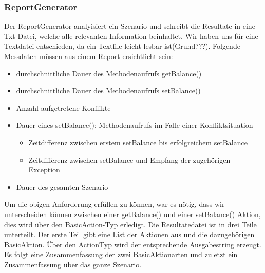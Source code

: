 \subsubsection{ReportGenerator}
\label{sec:reportGenerator}
Der ReportGenerator analyisiert ein Szenario und schreibt die Resultate in eine Txt-Datei, welche alle relevanten Information beinhaltet. Wir haben uns für eine Textdatei entschieden, da ein Textfile leicht lesbar ist(Grund???). Folgende Messdaten müssen aus einem Report ersichtlicht sein:
\begin{itemize}
\item durchschnittliche Dauer des Methodenaufrufs getBalance()
\item durchschnittliche Dauer des Methodenaufrufs setBalance()
\item Anzahl aufgetretene Konflikte
\item Dauer eines setBalance(); Methodenaufrufs im Falle einer Konfliktsituation
  \begin{itemize}
  \item Zeitdifferenz zwischen erstem setBalance bis erfolgreichem setBalance
  \item Zeitdifferenz zwischen setBalance und Empfang der zugehörigen Exception
  \end{itemize}
\item Dauer des gesamten Szenario
\end{itemize}

Um die obigen Anforderung erfüllen zu können, war es nötig, dass wir unterscheiden können zwischen einer getBalance() und einer setBalance() Aktion, dies wird über den BasicAction-Typ erledigt.
\newline
Die Resultatedatei ist in drei Teile unterteilt. Der erste Teil gibt eine List der Aktionen aus und die dazugehörigen BasicAktion. Über den ActionTyp wird der entsprechende Ausgabestring erzeugt. Es folgt eine Zusammenfassung der zwei BasicAktionarten und zuletzt ein Zusammenfassung über das ganze Szenario.






